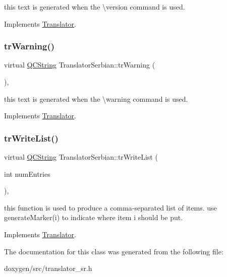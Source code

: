 this text is generated when the \textbackslash{}version command is used. 

Implements \mbox{\hyperlink{class_translator}{Translator}}.

\mbox{\label{class_translator_serbian_a96f06c7c38cded55d672fdde1207d737}} 
\subsubsection{\texorpdfstring{trWarning()}{trWarning()}}
{\footnotesize\ttfamily virtual \mbox{\hyperlink{class_q_c_string}{Q\+C\+String}} Translator\+Serbian\+::tr\+Warning (\begin{DoxyParamCaption}{ }\end{DoxyParamCaption})\hspace{0.3cm}{\ttfamily [inline]}, {\ttfamily [virtual]}}

this text is generated when the \textbackslash{}warning command is used. 

Implements \mbox{\hyperlink{class_translator}{Translator}}.

\mbox{\label{class_translator_serbian_aba929588153054499fe94a62e62b3328}} 
\subsubsection{\texorpdfstring{trWriteList()}{trWriteList()}}
{\footnotesize\ttfamily virtual \mbox{\hyperlink{class_q_c_string}{Q\+C\+String}} Translator\+Serbian\+::tr\+Write\+List (\begin{DoxyParamCaption}\item[{int}]{num\+Entries }\end{DoxyParamCaption})\hspace{0.3cm}{\ttfamily [inline]}, {\ttfamily [virtual]}}

this function is used to produce a comma-\/separated list of items. use generate\+Marker(i) to indicate where item i should be put. 

Implements \mbox{\hyperlink{class_translator}{Translator}}.



The documentation for this class was generated from the following file\+:\begin{DoxyCompactItemize}
\item 
doxygen/src/translator\+\_\+sr.\+h\end{DoxyCompactItemize}

